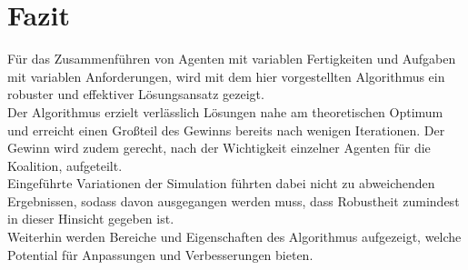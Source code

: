 \documentclass[fleqn,10pt]{SelfArx} %
\begin{document}
\section{Fazit}
\label{sec:Conclusion}
Für das Zusammenführen von Agenten mit variablen Fertigkeiten und Aufgaben mit variablen Anforderungen, wird mit dem hier vorgestellten Algorithmus ein robuster und effektiver Lösungsansatz gezeigt.\\ Der Algorithmus erzielt verlässlich Lösungen nahe am theoretischen Optimum und erreicht einen Großteil des Gewinns bereits nach wenigen Iterationen. Der Gewinn wird zudem gerecht, nach der Wichtigkeit einzelner Agenten für die Koalition, aufgeteilt.\\ Eingeführte Variationen der Simulation führten dabei nicht zu abweichenden Ergebnissen, sodass davon ausgegangen werden muss, dass Robustheit zumindest in dieser Hinsicht gegeben ist.\\ Weiterhin werden Bereiche und Eigenschaften des Algorithmus aufgezeigt, welche Potential für Anpassungen und Verbesserungen bieten.






\end{document}
